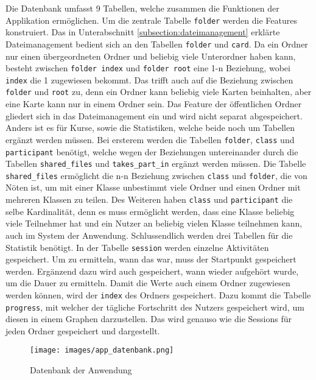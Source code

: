 Die Datenbank umfasst 9 Tabellen, welche zusammen die Funktionen der Applikation ermöglichen. Um die zentrale Tabelle \texttt{folder} werden die Features konstruiert. Das in Unterabschnitt \ref{subsection:dateimanagement} erklärte Dateimanagement bedient sich an den Tabellen \texttt{folder} und \texttt{card}. Da ein Ordner nur einen übergeordneten Ordner und beliebig viele Unterordner haben kann, besteht zwischen \texttt{folder index} und \texttt{folder root} eine 1-n Beziehung, wobei \texttt{index} die 1 zugewiesen bekommt. Das trifft auch auf die Beziehung zwischen \texttt{folder} und \texttt{root} zu, denn ein Ordner kann beliebig viele Karten beinhalten, aber eine Karte kann nur in einem Ordner sein. Das Feature der öffentlichen Ordner gliedert sich in das Dateimanagement ein und wird nicht separat abgespeichert. Anders ist es für Kurse, sowie die Statistiken, welche beide noch um Tabellen ergänzt werden müssen. Bei ersterem werden die Tabellen \texttt{folder}, \texttt{class} und \texttt{participant} benötigt, welche wegen der Beziehungen untereinander durch die Tabellen \texttt{shared\_files} und \texttt{takes\_part\_in} ergänzt werden müssen. Die Tabelle \texttt{shared\_files} ermöglicht die n-n Beziehung zwischen \texttt{class} und \texttt{folder}, die von Nöten ist, um mit einer Klasse unbestimmt viele Ordner und einen Ordner mit mehreren Klassen zu teilen. Des Weiteren haben \texttt{class} und \texttt{participant} die selbe Kardinalität, denn es muss ermöglicht werden, dass eine Klasse beliebig viele Teilnehmer hat und ein Nutzer an beliebig vielen Klasse teilnehmen kann, auch im System der Anwendung. Schlussendlich werden drei Tabellen für die Statistik benötigt. In der Tabelle \texttt{session} werden einzelne Aktivitäten gespeichert. Um zu ermitteln, wann das war, muss der Startpunkt gespeichert werden. Ergänzend dazu wird auch gespeichert, wann wieder aufgehört wurde, um die Dauer zu ermitteln. Damit die Werte auch einem Ordner zugewiesen werden können, wird der \texttt{index} des Ordners gespeichert. Dazu kommt die Tabelle \texttt{progress}, mit welcher der tägliche Fortschritt des Nutzers gespeichert wird, um diesen in einem Graphen darzustellen. Das wird genauso wie die Sessions für jeden Ordner gespeichert und dargestellt. 

\begin{figure}[H]
    \centering
    \texttt{[image: images/app\_datenbank.png]}
    \caption{Datenbank der Anwendung}
    \label{fig:appdatabase}
\end{figure}

